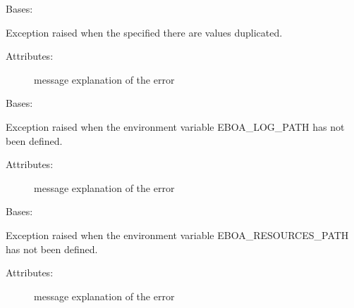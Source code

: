 
\begin{fulllineitems}
\label{\detokenize{eboa.engine:eboa.engine.errors.DuplicatedValues}}
Bases: {\hyperref[\detokenize{eboa.engine:eboa.engine.errors.Error}]{}}

Exception raised when the specified there are values duplicated.
\begin{description}
\item[{Attributes:}] \leavevmode
message \textendash{} explanation of the error

\end{description}

\end{fulllineitems}


\begin{fulllineitems}
\label{\detokenize{eboa.engine:eboa.engine.errors.EboaLogPathNotAvailable}}
Bases: {\hyperref[\detokenize{eboa.engine:eboa.engine.errors.Error}]{}}

Exception raised when the environment variable EBOA\_LOG\_PATH has not been defined.
\begin{description}
\item[{Attributes:}] \leavevmode
message \textendash{} explanation of the error

\end{description}

\end{fulllineitems}


\begin{fulllineitems}
\label{\detokenize{eboa.engine:eboa.engine.errors.EboaResourcesPathNotAvailable}}
Bases: {\hyperref[\detokenize{eboa.engine:eboa.engine.errors.Error}]{}}

Exception raised when the environment variable EBOA\_RESOURCES\_PATH has not been defined.
\begin{description}
\item[{Attributes:}] \leavevmode
message \textendash{} explanation of the error

\end{description}

\end{fulllineitems}

